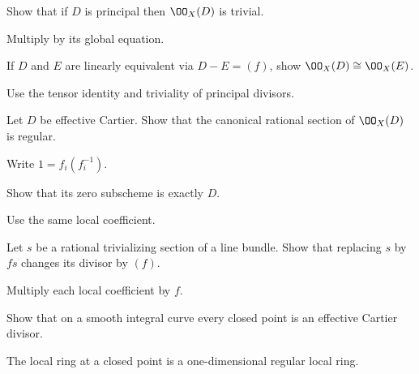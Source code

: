 \fi
\begin{exercise}\label{exr:vi40-19}
Show that if \(D\) is principal then \(\OO_X(D)\) is trivial.
\end{exercise}
\ifdefined\IncludeExerciseHints
\begin{hint}
Multiply by its global equation.
\end{hint}
\fi
\begin{exercise}\label{exr:vi40-20}
If \(D\) and \(E\) are linearly equivalent via \(D-E=(f)\), show \(\OO_X(D)\cong\OO_X(E)\).
\end{exercise}
\ifdefined\IncludeExerciseHints
\begin{hint}
Use the tensor identity and triviality of principal divisors.
\end{hint}
\fi
\begin{exercise}\label{exr:vi40-21}
Let \(D\) be effective Cartier.  Show that the canonical rational section of \(\OO_X(D)\) is regular.
\end{exercise}
\ifdefined\IncludeExerciseHints
\begin{hint}
Write \(1=f_i(f_i^{-1})\).
\end{hint}
\fi
\begin{exercise}\label{exr:vi40-22}
Show that its zero subscheme is exactly \(D\).
\end{exercise}
\ifdefined\IncludeExerciseHints
\begin{hint}
Use the same local coefficient.
\end{hint}
\fi
\begin{exercise}\label{exr:vi40-23}
Let \(s\) be a rational trivializing section of a line bundle.  Show that replacing \(s\) by \(fs\) changes its divisor by \((f)\).
\end{exercise}
\ifdefined\IncludeExerciseHints
\begin{hint}
Multiply each local coefficient by \(f\).
\end{hint}
\fi
\begin{exercise}\label{exr:vi40-24}
Show that on a smooth integral curve every closed point is an effective Cartier divisor.
\end{exercise}
\ifdefined\IncludeExerciseHints
\begin{hint}
The local ring at a closed point is a one-dimensional regular local ring.
\end{hint}
\fi
\ifdefined\IncludeExerciseSolutions
